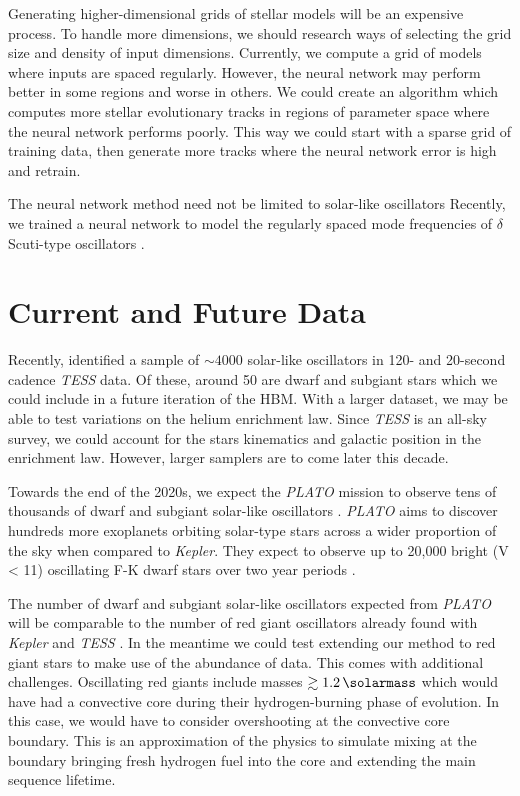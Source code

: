 Generating higher-dimensional grids of stellar models will be an expensive process. To handle more dimensions, we should research ways of selecting the grid size and density of input dimensions. Currently, we compute a grid of models where inputs are spaced regularly. However, the neural network may perform better in some regions and worse in others. We could create an algorithm which computes more stellar evolutionary tracks in regions of parameter space where the neural network performs poorly. This way we could start with a sparse grid of training data, then generate more tracks where the neural network error is high and retrain.

The neural network method need not be limited to solar-like oscillators Recently, we trained a neural network to model the regularly spaced mode frequencies of \(\delta\) Scuti-type oscillators \citep{Scutt.Murphy.ea2023}.

\section{Current and Future Data}

Recently, \citet{Hatt.Nielsen.ea2023} identified a sample of \(\sim 4000\) solar-like oscillators in 120- and 20-second cadence \emph{TESS} data. Of these, around 50  are dwarf and subgiant stars which we could include in a future iteration of the HBM. With a larger dataset, we may be able to test variations on the helium enrichment law. Since \emph{TESS} is an all-sky survey, we could account for the stars kinematics and galactic position in the enrichment law. 
However, larger samplers are to come later this decade.

Towards the end of the 2020s, we expect the \emph{PLATO} mission to observe tens of thousands of dwarf and subgiant solar-like oscillators \citep{Rauer.Catala.ea2014}. \emph{PLATO} aims to discover hundreds more exoplanets orbiting solar-type stars across a wider proportion of the sky when compared to \emph{Kepler}. They expect to observe up to 20,000 bright (V < 11) oscillating F-K dwarf stars over two year periods \citep{Goupil2017}.

The number of dwarf and subgiant solar-like oscillators expected from \emph{PLATO} will be comparable to the number of red giant oscillators already found with \emph{Kepler} and \emph{TESS} \needcite. In the meantime we could test extending our method to red giant stars to make use of the abundance of data. This comes with additional challenges. Oscillating red giants include masses \(\gtrsim \SI{1.2}{\solarmass}\) which would have had a convective core during their hydrogen-burning phase of evolution. In this case, we would have to consider overshooting at the convective core boundary. This is an approximation of the physics to simulate mixing at the boundary bringing fresh hydrogen fuel into the core and extending the main sequence lifetime.

